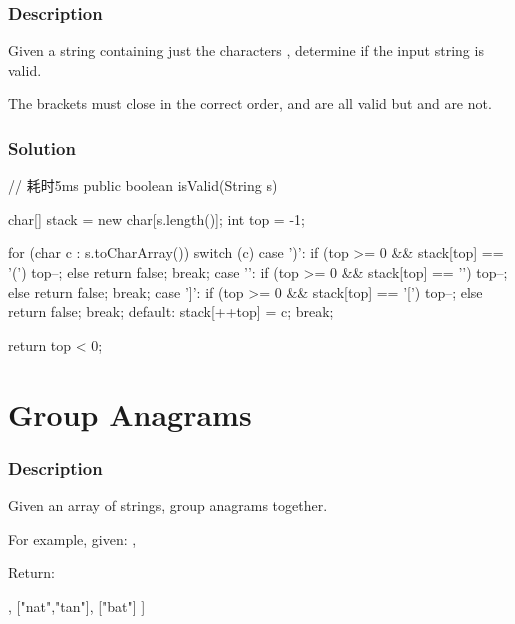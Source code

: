 \subsubsection{Description}
Given a string containing just the characters , determine if the input string is valid.

The brackets must close in the correct order,  and  are all valid but \code{"(]"} and  are not.
\subsubsection{Solution}

\begin{Code}
// 耗时5ms
public boolean isValid(String s) {
    char[] stack = new char[s.length()];
    int top = -1;

    for (char c : s.toCharArray()) {
        switch (c) {
            case ')':
                if (top >= 0 && stack[top] == '(') {
                    top--;
                } else {
                    return false;
                }
                break;
            case '}':
                if (top >= 0 && stack[top] == '{') {
                    top--;
                } else {
                    return false;
                }
                break;
            case ']':
                if (top >= 0 && stack[top] == '[') {
                    top--;
                } else {
                    return false;
                }
                break;
            default:
                stack[++top] = c;
                break;
        }
    }

    return top < 0;
}
\end{Code}

\newpage

\section{Group Anagrams} %

\subsubsection{Description}
Given an array of strings, group anagrams together.

For example, given: ,

Return:
\begin{Code}
[
  ["ate", "eat","tea"],
  ["nat","tan"],
  ["bat"]
]
\end{Code}

